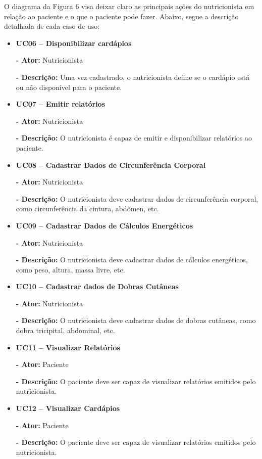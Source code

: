 \documentclass[
	12pt,				%
    oneside,			%
	a4paper,			%
	english,			%
	french,				%
	spanish,			%
	brazil,				%
	]{abntex2}
\begin{document}
O diagrama da Figura 6 visa deixar claro as principais ações do nutricionista
em relação ao paciente e o que o paciente pode fazer. Abaixo, segue a descrição
detalhada de cada caso de uso:

\begin{itemize}
\item \textbf{UC06 – Disponibilizar cardápios}

\textbf{- Ator:} Nutricionista

\textbf{- Descrição:} Uma vez cadastrado, o nutricionista define se o
cardápio está ou não disponível para o paciente.

\item \textbf{UC07 – Emitir relatórios}

\textbf{- Ator:} Nutricionista

\textbf{- Descrição:} O nutricionista é capaz de emitir e disponibilizar
relatórios ao paciente.

\item \textbf{UC08 – Cadastrar Dados de Circunferência Corporal}

\textbf{- Ator:} Nutricionista

\textbf{- Descrição:} O nutricionista deve cadastrar dados de
circunferência corporal, como circunferência da cintura, abdômen,
etc.

\item \textbf{UC09 – Cadastrar Dados de Cálculos Energéticos}

\textbf{- Ator:} Nutricionista

\textbf{- Descrição:} O nutricionista deve cadastrar dados de cálculos
energéticos, como peso, altura, massa livre, etc.

\item \textbf{UC10 – Cadastrar dados de Dobras Cutâneas}

\textbf{- Ator:} Nutricionista

\textbf{- Descrição:} O nutricionista deve cadastrar dados de dobras
cutâneas, como dobra tricipital, abdominal, etc.

\item \textbf{UC11 – Visualizar Relatórios}

\textbf{- Ator:} Paciente

\textbf{- Descrição:} O paciente deve ser capaz de visualizar relatórios
emitidos pelo nutricionista.

\item \textbf{UC12 – Visualizar Cardápios}

\textbf{- Ator:} Paciente

\textbf{- Descrição:} O paciente deve ser capaz de visualizar relatórios
emitidos pelo nutricionista.

\end{itemize}
\end{document}
